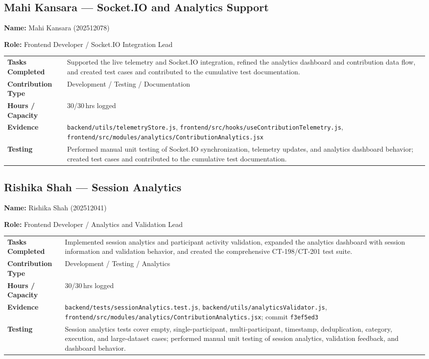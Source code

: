 \documentclass[11pt,a4paper]{article}
\newcommand{\field}[2]{\textbf{#1:} #2\par}
\begin{document}
\subsection{Mahi Kansara --- Socket.IO and Analytics Support}
\field{Name}{Mahi Kansara (202512078)}
\field{Role}{Frontend Developer / Socket.IO Integration Lead}
{\small
\begin{tabularx}{\textwidth}{>{\bfseries}p{}Y}
\toprule
Tasks Completed & Supported the live telemetry and Socket.IO integration, refined the analytics dashboard and contribution data flow, and created test cases and contributed to the cumulative test documentation. \\
Contribution Type & Development / Testing / Documentation \\
Hours / Capacity & 30/30\,hrs logged \\
Evidence & \texttt{backend/utils/telemetryStore.js}, \texttt{frontend/src/hooks/useContributionTelemetry.js}, \texttt{frontend/src/modules/analytics/ContributionAnalytics.jsx} \\
Testing & Performed manual unit testing of Socket.IO synchronization, telemetry updates, and analytics dashboard behavior; created test cases and contributed to the cumulative test documentation. \\
\bottomrule
\end{tabularx}
}

\subsection{Rishika Shah --- Session Analytics}
\field{Name}{Rishika Shah (202512041)}
\field{Role}{Frontend Developer / Analytics and Validation Lead}
{\small
\begin{tabularx}{\textwidth}{>{\bfseries}p{}Y}
\toprule
Tasks Completed & Implemented session analytics and participant activity validation, expanded the analytics dashboard with session information and validation behavior, and created the comprehensive CT-198/CT-201 test suite. \\
Contribution Type & Development / Testing / Analytics \\
Hours / Capacity & 30/30\,hrs logged \\
Evidence & \texttt{backend/tests/sessionAnalytics.test.js}, \texttt{backend/utils/analyticsValidator.js}, \texttt{frontend/src/modules/analytics/ContributionAnalytics.jsx}; commit \texttt{f3ef5ed3} \\
Testing & Session analytics tests cover empty, single-participant, multi-participant, timestamp, deduplication, category, execution, and large-dataset cases; performed manual unit testing of session analytics, validation feedback, and dashboard behavior. \\
\bottomrule
\end{tabularx}
}
\end{document}
